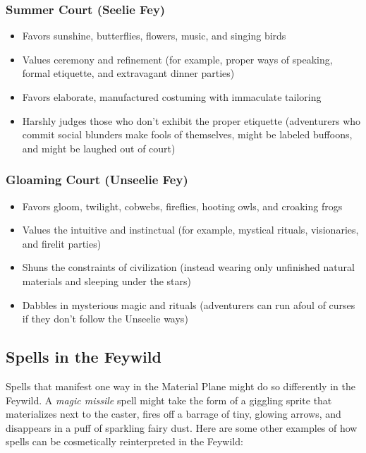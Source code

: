 \documentclass[10pt,a4paper,twoside,twocolumn,openany,nodeprecatedcode,bg=print]{dndbook}
\begin{document}
\subsubsection{Summer Court (Seelie Fey)}
\begin{itemize}

\item Favors sunshine, butterflies, flowers, music, and singing birds
\item Values ceremony and refinement (for example, proper ways of speaking, formal etiquette, and extravagant dinner parties)
\item Favors elaborate, manufactured costuming with immaculate tailoring
\item Harshly judges those who don't exhibit the proper etiquette (adventurers who commit social blunders make fools of themselves, might be labeled buffoons, and might be laughed out of court)
\end{itemize}


\subsubsection{Gloaming Court (Unseelie Fey)}
\begin{itemize}

\item Favors gloom, twilight, cobwebs, fireflies, hooting owls, and croaking frogs
\item Values the intuitive and instinctual (for example, mystical rituals, visionaries, and firelit parties)
\item Shuns the constraints of civilization (instead wearing only unfinished natural materials and sleeping under the stars)
\item Dabbles in mysterious magic and rituals (adventurers can run afoul of curses if they don't follow the Unseelie ways)
\end{itemize}


\subsection{Spells in the Feywild}
Spells that manifest one way in the Material Plane might do so differently in the Feywild. A \textit{magic missile} spell might take the form of a giggling sprite that materializes next to the caster, fires off a barrage of tiny, glowing arrows, and disappears in a puff of sparkling fairy dust. Here are some other examples of how spells can be cosmetically reinterpreted in the Feywild:
\end{document}
